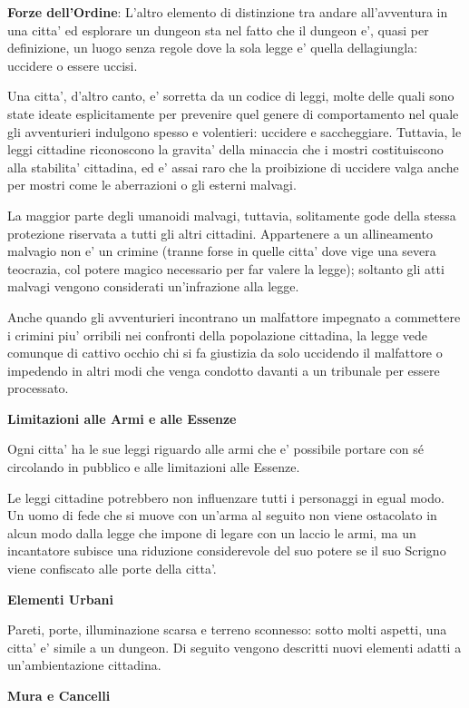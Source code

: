 \documentclass[a4paper,11pt,twoside,openany]{book}
\begin{document}
\textbf{Forze dell'Ordine}: L'altro elemento di distinzione tra andare all'avventura in una citta' ed esplorare un dungeon sta nel fatto che il dungeon e', quasi per definizione, un luogo senza regole dove la sola legge e' quella dellagiungla: uccidere o essere uccisi.

Una citta', d'altro canto, e' sorretta da un codice di leggi, molte delle quali sono state ideate esplicitamente per prevenire quel genere di comportamento nel quale gli avventurieri indulgono spesso e volentieri: uccidere e saccheggiare. Tuttavia, le leggi cittadine riconoscono la gravita' della minaccia che i mostri costituiscono alla stabilita' cittadina, ed e' assai raro che la proibizione di uccidere valga anche per mostri come le aberrazioni o gli esterni malvagi.

La maggior parte degli umanoidi malvagi, tuttavia, solitamente gode della stessa protezione riservata a tutti gli altri cittadini. Appartenere a un allineamento malvagio non e' un crimine (tranne forse in quelle citta' dove vige una severa teocrazia, col potere magico necessario per far valere la legge); soltanto gli atti malvagi vengono considerati un'infrazione alla legge. 

Anche quando gli avventurieri incontrano un malfattore impegnato a commettere i crimini piu' orribili nei confronti della popolazione cittadina, la legge vede comunque di cattivo occhio chi si fa giustizia da solo uccidendo il malfattore o impedendo in altri modi che venga condotto davanti a un tribunale per essere processato.

\textbf{Limitazioni alle Armi e alle Essenze}

Ogni citta' ha le sue leggi riguardo alle armi che e' possibile portare con sé circolando in pubblico e alle limitazioni alle Essenze.

Le leggi cittadine potrebbero non influenzare tutti i personaggi in egual modo. Un uomo di fede che si muove con un'arma al seguito non viene ostacolato in alcun modo dalla legge che impone di legare con un laccio le armi, ma un incantatore subisce una riduzione considerevole del suo potere se il suo Scrigno viene confiscato alle porte della citta'.

\textbf{Elementi Urbani}

Pareti, porte, illuminazione scarsa e terreno sconnesso: sotto molti aspetti, una citta' e' simile a un dungeon. Di seguito vengono descritti nuovi elementi adatti a un'ambientazione cittadina.

\textbf{Mura e Cancelli}
\end{document}

